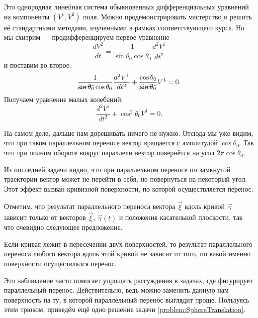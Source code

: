 \begin{firstsolution}
	Это однородная линейная система обыкновенных дифференциальных уравнений на компоненты $(V^1, V^2)$ поля. Можно продемонстрировать мастерство и решить её стандартными методами, изученными в рамках соответствующего курса. Но мы схитрим --- продифференцируем первое уравнение
	\[
		\frac{dV^2}{dt} = \frac{1}{\sin\theta_0\cos\theta_0}\frac{d^2V^1}{dt^2}
	\]
	и поставим во второе:
	\[
		\frac{1}{\cancel{\sin\theta_0}\cos\theta_0}\frac{d^2V^1}{dt^2} + \frac{\cos\theta_0}{\cancel{\sin\theta_0}}V^1 = 0.
	\]
	Получаем уравнение малых колебаний:
	\[
		\frac{d^2V^1}{dt^2} + \cos^2\theta_0V^1 = 0.
	\]

	На самом деле, дальше нам дорешивать ничего не нужно. Отсюда мы уже видим, что при таком параллельном переносе вектор вращается с амплитудой $\cos\theta_0$. Так что при полном обороте вокруг параллели вектор повернётся на угол $2\pi\cos\theta_0$.
\end{firstsolution}

Из последней задачи видно, что при параллельном переносе по замкнутой траектории вектор может не перейти в себя, но повернуться на некоторый угол. Этот эффект вызван кривизной поверхности, по которой осуществляется перенос.

Отметим, что результат параллельного переноса вектора $\vec{\xi}$ вдоль кривой $\vec{\gamma}$ зависит только от векторов $\vec{\xi}$, $\dot{\vec{\gamma}}(t)$ и положения касательной плоскости, так что очевидно следующее предложение.

\begin{proposition}
	Если кривая лежит в пересечении двух поверхностей, то результат параллельного переноса любого вектора вдоль этой кривой не зависит от того, по какой именно поверхности осуществлялся перенос.
\end{proposition}

Это наблюдение часто помогает упрощать рассуждения в задачах, где фигурирует параллельный перенос. Действительно, ведь можно заменить данную нам поверхность на ту, в которой параллельный перенос выглядит проще. Пользуясь этим трюком, приведём ещё одно решение задачи \ref{problem:SphereTranslation}.

